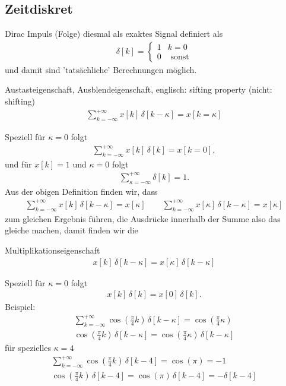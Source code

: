 \subsection{Zeitdiskret}
Dirac Impuls (Folge) diesmal als exaktes Signal definiert als
\begin{align}
\delta[k] =
\begin{cases}
1 & k=0\\
0 & \text{ sonst}
\end{cases}
\end{align}
und damit sind 'tatsächliche' Berechnungen möglich.
\begin{mdframed}
Austasteigenschaft, Ausblendeigenschaft, englisch: sifting property (nicht: shifting)
\begin{align}
\sum\limits_{k=-\infty}^{+\infty} x[k] \, \delta[k-\kappa] = x[k=\kappa]
\label{eq:AppA_SifitingDT}
\end{align}
\end{mdframed}
Speziell für $\kappa=0$ folgt
\begin{align}
\sum\limits_{k=-\infty}^{+\infty} x[k] \, \delta[k] = x[k=0],
\end{align}
und für $x[k]=1$ und $\kappa=0$ folgt
\begin{align}
\sum\limits_{\kappa=-\infty}^{+\infty} \delta[k] = 1.
\end{align}
Aus der obigen Definition finden wir, dass
\begin{align}
\sum\limits_{k=-\infty}^{+\infty} x[k] \, \delta[k-\kappa] = x[\kappa]\qquad
\sum\limits_{k=-\infty}^{+\infty} x[\kappa] \, \delta[k-\kappa] = x[\kappa]
\end{align}
zum gleichen Ergebnis führen, die Ausdrücke innerhalb der Summe also das gleiche
machen, damit finden wir die
\begin{mdframed}
Multiplikationseigenschaft
\begin{align}
x[k] \, \delta[k-\kappa] = x[\kappa] \, \delta[k-\kappa]
\end{align}
\end{mdframed}
Speziell für $\kappa=0$ folgt
\begin{align}
x[k] \, \delta[k] = x[0] \, \delta[k].
\end{align}
%
Beispiel:
\begin{align}
\sum\limits_{k=-\infty}^{+\infty} \cos(\frac{\pi}{4} k) \, \delta[k-\kappa] =\cos(\frac{\pi}{4} \kappa)\\
\cos(\frac{\pi}{4} k) \, \delta[k-\kappa] = \cos(\frac{\pi}{4} \kappa) \, \delta[k-\kappa]
\end{align}
für spezielles $\kappa=4$
\begin{align}
\sum\limits_{k=-\infty}^{+\infty} \cos(\frac{\pi}{4} k) \, \delta[k-4] =\cos(\pi) = -1\\
\cos(\frac{\pi}{4} k) \, \delta[k-4] = \cos(\pi) \, \delta[k-4] = -\delta[k-4]
\end{align}

